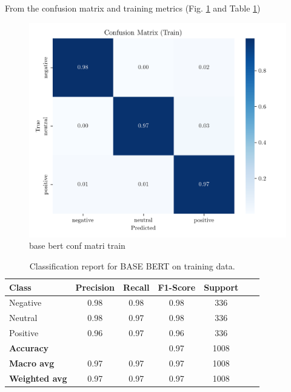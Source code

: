 \documentclass[conference]{IEEEtran}
\begin{document}
From the confusion matrix and training metrics (Fig. \ref{fig:base_bert_confusion_matrix_Train} and Table \ref{cr_basebert_train})
\begin{figure}[H]
    \centering
    \includegraphics[width=1\linewidth]{assets/base_bert_confusion_matrix_Train.png}
    \caption{base bert conf matri train}
    \label{fig:base_bert_confusion_matrix_Train}
\end{figure}

\begin{table}[H]
\centering
\caption{Classification report for BASE BERT on training data.}
\label{cr_basebert_train}
\begin{tabular}{lcccccc}
\toprule
\textbf{Class} & \textbf{Precision} & \textbf{Recall} & \textbf{F1-Score} & \textbf{Support} \\
\midrule
Negative & 0.98 & 0.98 & 0.98 & 336 \\
Neutral & 0.98 & 0.97 & 0.98 & 336 \\
Positive & 0.96 & 0.97 & 0.96 & 336 \\
\midrule
\textbf{Accuracy} &  &  & 0.97 & 1008 \\
\textbf{Macro avg} & 0.97 & 0.97 & 0.97 & 1008 \\
\textbf{Weighted avg} & 0.97 & 0.97 & 0.97 & 1008 \\
\bottomrule
\end{tabular}
\end{table}
\end{document}
